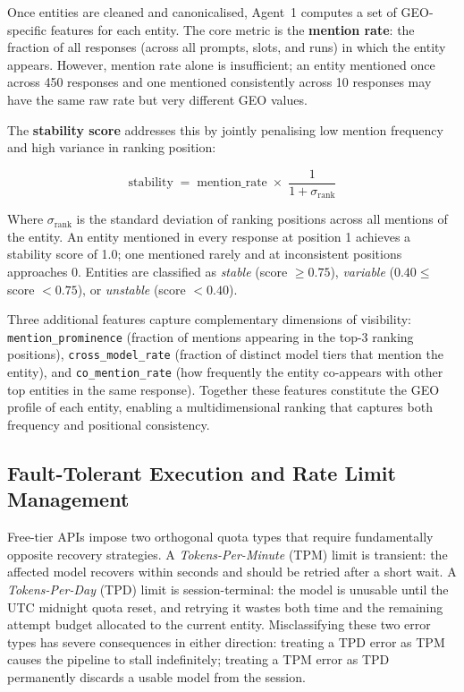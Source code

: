 Once entities are cleaned and canonicalised, Agent~1 computes a set of
GEO-specific features for each entity. The core metric is the \textbf{mention rate}:
the fraction of all responses (across all prompts, slots, and runs) in which the
entity appears. However, mention rate alone is insufficient; an entity mentioned
once across 450 responses and one mentioned consistently across 10 responses may
have the same raw rate but very different GEO values.

The \textbf{stability score} addresses this by jointly penalising low mention
frequency and high variance in ranking position:

\begin{equation}
\text{stability} \;=\; \text{mention\_rate} \;\times\; \frac{1}{1 + \sigma_{\text{rank}}}
\label{eq:stability}
\end{equation}

Where $\sigma_{\text{rank}}$ is the standard deviation of ranking positions across
all mentions of the entity. An entity mentioned in every response at position 1
achieves a stability score of 1.0; one mentioned rarely and at inconsistent positions
approaches 0. Entities are classified as \textit{stable} (score $\geq 0.75$),
\textit{variable} ($0.40 \leq$ score $< 0.75$), or \textit{unstable} (score $< 0.40$).

Three additional features capture complementary dimensions of visibility:
\texttt{mention\_prominence} (fraction of mentions appearing in the top-3 ranking positions),
\texttt{cross\_model\_rate} (fraction of distinct model tiers that mention the entity),
and \texttt{co\_mention\_rate} (how frequently the entity co-appears with other top
entities in the same response). Together these features constitute the GEO profile
of each entity, enabling a multidimensional ranking that captures both frequency
and positional consistency.

\subsection{Fault-Tolerant Execution and Rate Limit Management}

Free-tier APIs impose two orthogonal quota types that require fundamentally opposite
recovery strategies. A \textit{Tokens-Per-Minute} (TPM) limit is transient: the
affected model recovers within seconds and should be retried after a short wait.
A \textit{Tokens-Per-Day} (TPD) limit is session-terminal: the model is unusable
until the UTC midnight quota reset, and retrying it wastes both time and the remaining
attempt budget allocated to the current entity. Misclassifying these two error types
has severe consequences in either direction: treating a TPD error as TPM causes the
pipeline to stall indefinitely; treating a TPM error as TPD permanently discards a
usable model from the session.

